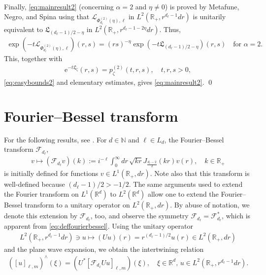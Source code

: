 \documentclass[12pt,reqno]{amsart}
\theoremstyle{definition}
\theoremstyle{remark}
\numberwithin{equation}{section}
\newcommand{\1}{\mathbbm{1}}
\newcommand{\F}{\mathcal{F}}
\newcommand{\N}{\mathbb{N}}
\newcommand{\R}{\mathbb{R}}
\def\cl{\mathcal{L}}
\def\fl{\mathfrak{L}}
\newcommand{\me}[1]{\mathrm{e}^{#1}}
\begin{document}
Finally, \eqref{eq:mainresult2} (concerning $\alpha=2$ and $\eta\neq0$) is proved by Metafune, Negro, and Spina \cite[Theorem~4.12, Proposition~4.14]{Metafuneetal2018} using that $\cl_{\Phi_{d_\ell}^{(2)}(\eta),\ell}$ in $L^2(\R_+,r^{d_\ell-1}dr)$ is unitarily equivalent to $\fl_{(d_\ell-1)/2-\eta}$ in $L^2(\R_+,r^{d_\ell-1-2\eta}dr)$. Thus,
\begin{align}
  \exp\left(-t\cl_{\Phi_{d_\ell}^{(2)}(\eta),\ell}\right)(r,s) = (rs)^{-\eta} \exp\left(-t\fl_{(d_\ell-1)/2-\eta}\right)(r,s) \quad \text{for $\alpha=2$}.
\end{align}
This, together with 
\begin{align}
  \label{eq:heatkernellzeta}
  \me{-t\fl_\zeta}(r,s) = p_\zeta^{(2)}(t,r,s), \quad t,r,s>0,
\end{align}
\eqref{eq:easybounds2} and elementary estimates, gives \eqref{eq:mainresult2}.
\qed




\appendix

\section{Fourier--Bessel transform}

For the following results, see \cite[Appendix~A]{BogdanMerz2024}.
For $d\in\N$ and $\ell\in L_d$, the Fourier--Bessel transform $\F_{d_\ell}$,
\begin{align}
  \label{eq:deffourierbessel}
  v\mapsto (\F_{d_\ell} v)(k) := i^{-\ell}\int_0^\infty dr\, \sqrt{kr}J_{\frac{d_\ell-2}{2}}(kr) v(r),
  \quad k\in\R_+
\end{align}\index{$\F_\ell$}is initially defined for functions $v\in L^1(\R_+,dr)$. Note also that this transform is well-defined because $(d_\ell-1)/2>-1/2$. The same arguments used to extend the Fourier transform on $L^1(\R^d)$ to $L^2(\R^d)$ allow one to extend the Fourier--Bessel transform to a unitary operator on $L^2(\R_+,dr)$. By abuse of notation, we denote this extension by $\F_{d_\ell}$, too, and observe the symmetry $\F_{d_\ell}=\F_{d_\ell}^*$, which is apparent from \eqref{eq:deffourierbessel}. Using the unitary operator
\begin{align}
  \label{eq:defdoob}
  L^2(\R_+,r^{d_\ell-1}dr) \ni u \mapsto (Uu)(r)=r^{(d_\ell-1)/2}u(r) \in L^2(\R_+,dr)
\end{align}
and the plane wave expansion, we obtain the intertwining relation
\begin{align}
  \label{eq:fourierbesselintertwine2}
  \left([u]_{\ell,m}\right)^\wedge(\xi) = \left(U^*[\F_{d_\ell} Uu]_{\ell,m}\right)(\xi),
  \quad \xi\in\R^d,\, u\in L^2(\R_+,r^{d_\ell-1}dr).
\end{align}
\end{document}
